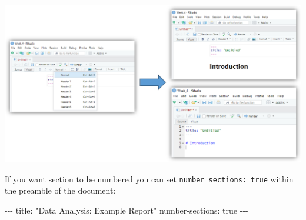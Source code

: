 \documentclass[
  letterpaper,
  DIV=11,
  numbers=noendperiod]{scrartcl}
\newenvironment{Shaded}{\begin{snugshade}}{\end{snugshade}}
\newcommand{\NormalTok}[1]{\textcolor[rgb]{0.00,0.23,0.31}{#1}}
\newcommand{\SpecialCharTok}[1]{\textcolor[rgb]{0.37,0.37,0.37}{#1}}
\newcommand{\StringTok}[1]{\textcolor[rgb]{0.13,0.47,0.30}{#1}}
\begin{document}
\begin{center}
\includegraphics[width=7.64583in,height=\textheight]{images/quarto3.png}
\end{center}

If you want section to be numbered you can set
\texttt{number\_sections:\ true} within the preamble of the document:

\begin{Shaded}
\begin{Highlighting}[]
\SpecialCharTok{{-}{-}{-}}
\NormalTok{title}\SpecialCharTok{:} \StringTok{"Data Analysis: Example Report"}
\NormalTok{number}\SpecialCharTok{{-}}\NormalTok{sections}\SpecialCharTok{:}\NormalTok{ true}
\SpecialCharTok{{-}{-}{-}}
\end{Highlighting}
\end{Shaded}
\end{document}
